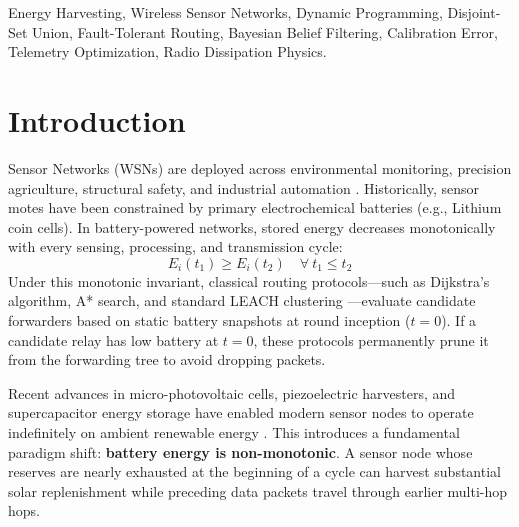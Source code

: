 \documentclass[journal]{IEEEtran}
\begin{document}
\begin{abstract}
The proposed framework is verified through an automated 75-test unit suite (100\% pass rate in 1.51s) and extensive multi-seed statistical benchmarks ($N=30$ seeds, 350 rounds). Under scarce solar irradiance, our belief-driven routing closes up to $81.5\%$ of the omniscient oracle delivery gap while reducing Expected Calibration Error from $0.039$ to $0.019$ over stale telemetry. In a real-world case study on the Great Duck Island habitat topology ($N=32$ motes, 60\% spruce canopy shade), our framework sustains 100\% mote survival with zero node deaths across 500 rounds (+15.5\% mission extension over LEACH).
\end{abstract}

\begin{IEEEkeywords}
Energy Harvesting, Wireless Sensor Networks, Dynamic Programming, Disjoint-Set Union, Fault-Tolerant Routing, Bayesian Belief Filtering, Calibration Error, Telemetry Optimization, Radio Dissipation Physics.
\end{IEEEkeywords}

\section{Introduction}

 Sensor Networks (WSNs) are deployed across environmental monitoring, precision agriculture, structural safety, and industrial automation \cite{akyildiz2002survey, sah2020renewable}. Historically, sensor motes have been constrained by primary electrochemical batteries (e.g., Lithium coin cells). In battery-powered networks, stored energy decreases monotonically with every sensing, processing, and transmission cycle:
\begin{equation}
E_i(t_1) \ge E_i(t_2) \quad \forall\ t_1 \le t_2
\end{equation}
Under this monotonic invariant, classical routing protocols---such as Dijkstra's algorithm, A* search, and standard LEACH clustering \cite{heinzelman2002application}---evaluate candidate forwarders based on static battery snapshots at round inception ($t = 0$). If a candidate relay has low battery at $t = 0$, these protocols permanently prune it from the forwarding tree to avoid dropping packets.

Recent advances in micro-photovoltaic cells, piezoelectric harvesters, and supercapacitor energy storage have enabled modern sensor nodes to operate indefinitely on ambient renewable energy \cite{sudevalayam2011energy, sharma2020energy}. This introduces a fundamental paradigm shift: \textbf{battery energy is non-monotonic}. A sensor node whose reserves are nearly exhausted at the beginning of a cycle can harvest substantial solar replenishment while preceding data packets travel through earlier multi-hop hops.
\end{document}
